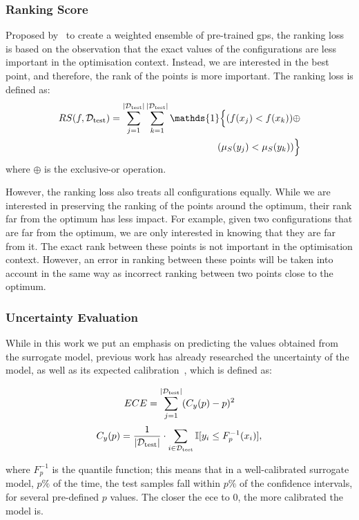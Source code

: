 \subsubsection{Ranking Score}
Proposed by~\citet{FeuEtAl18b} to create a weighted ensemble of pre-trained \glspl{gp}, the ranking loss is based on the observation that the exact values of the configurations are less important in the optimisation context. Instead, we are interested in the best point, and therefore, the rank of the points is more important. The ranking loss is defined as:
\begin{equation*}
    \begin{aligned}
        RS(f, \test) = \sum_{j=1}^{|\test|} \sum_{k=1}^{|\test|}
        \mathds{1} \Big\{ (f(x_j) < f(x_k)) \oplus \\
        \quad (\mu_S(y_j) < \mu_S(y_k)) \Big\}
    \end{aligned}
\end{equation*}
where $\oplus$ is the exclusive-or operation.

However, the ranking loss also treats all configurations equally. While we are interested in preserving the ranking of the points around the optimum, their rank far from the optimum has less impact. For example, given two configurations that are far from the optimum, we are only interested in knowing that they are far from it. The exact rank between these points is not important in the optimisation context. However, an error in ranking between these points will be taken into account in the same way as incorrect ranking between two points close to the optimum.

\subsubsection{Uncertainty Evaluation}
While in this work we put an emphasis on predicting the values obtained from the surrogate model, previous work has already researched the uncertainty of the model, as well as its expected calibration~\cite{FolEtAl23b,KulEtAl18}, which is defined as:

\begin{equation*}
    ECE=\sum_{j=1}^{|\mathcal{D}_{\text{test}}|} (C_y(p)-p)^2
\end{equation*}
\begin{equation*}
    C_y(p)=\frac{1}{|\mathcal{D}_{\text{test}}|}\cdot \sum_{i\in \mathcal{D}_{\text{test}}} \mathbb{I}[y_i \leq F^{-1}_p(x_i)],
\end{equation*}

where $F^{-1}_p$
is the quantile function; this means that in a well-calibrated surrogate model, $p\%$  of the time, the test samples fall within $p\%$ of the confidence intervals, for several pre-defined $p$ values. The closer the \gls{ece} to $0$, the more calibrated the model is.

